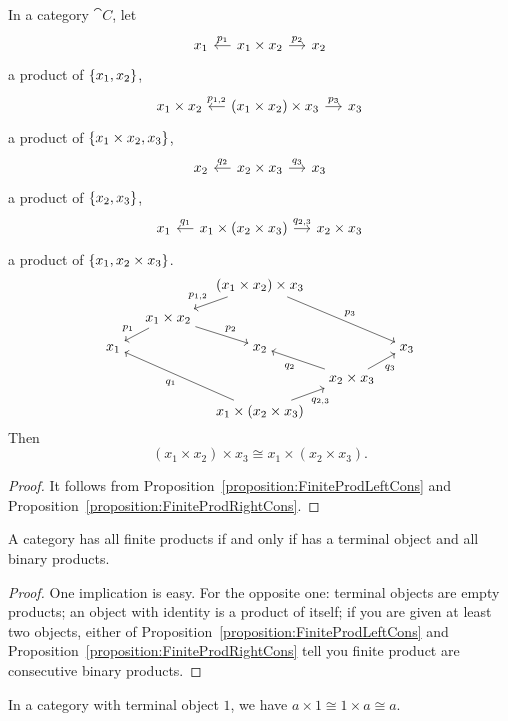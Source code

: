 \begin{corollary}\label{corollary:ProdAssoc}
In a category \(\cat C\), let
\[\begin{tikzcd}[sep=small]
x_1 & x_1 \times x_2 \ar["{p_1}", l, swap] \ar["{p_2}", r] & x_2
\end{tikzcd}\]
a product of \(\left\{x_1, x_2\right\}\),
\[\begin{tikzcd}[sep=small]
x_1 \times x_2 & (x_1 \times x_2) \times x_3 \ar["{p_{1,2}}", l, swap] \ar["{p_3}", r] & x_3
\end{tikzcd}\]
a product of \(\left\{x_1 \times x_2, x_3\right\}\),
\[\begin{tikzcd}[sep=small]
x_2 & x_2 \times x_3 \ar["{q_2}", l, swap] \ar["{q_3}", r] & x_3
\end{tikzcd}\]
a product of \(\left\{x_2, x_3\right\}\),
\[\begin{tikzcd}[sep=small]
x_1 & x_1 \times (x_2 \times x_3) \ar["{q_1}", l, swap] \ar["{q_{2,3}}", r] & x_2 \times x_3
\end{tikzcd}\]
a product of \(\left\{x_1, x_2 \times x_3\right\}\).
\[\begin{tikzcd}[sep=small,cramped]
& & (x_1 \times x_2) \times x_3 \ar["{p_{1,2}}", dl, swap] \ar["{p_3}", ddrr] \\
& x_1 \times x_2 \ar["{p_1}", dl, swap] \ar["{p_2}", dr] \\
x_1 & & x_2 & & x_3 \\
& & & x_2 \times x_3 \ar["{q_2}", ul] \ar["{q_3}", ur, swap] \\
& & x_1 \times (x_2 \times x_3) \ar["{q_1}", uull] \ar["{q_{2, 3}}", ur, swap]
\end{tikzcd}\]
Then
\[(x_1 \times x_2) \times x_3 \cong x_1 \times (x_2 \times x_3) .\]
\end{corollary}

\begin{proof}
It follows from Proposition~\ref{proposition:FiniteProdLeftCons} and Proposition~\ref{proposition:FiniteProdRightCons}.
\end{proof}

\begin{corollary}\label{corollary:FiniteProductsIffTerminalAndBinaryProducts}
A category has all finite products if and only if has a terminal object and all binary products.
\end{corollary}

\begin{proof}
One implication is easy. For the opposite one: terminal objects are empty products; an object with identity is a product of itself; if you are given at least two objects, either of Proposition~\ref{proposition:FiniteProdLeftCons} and Proposition~\ref{proposition:FiniteProdRightCons} tell you finite product are consecutive binary products.
\end{proof}

\begin{exercise}
In a category with terminal object \(1\), we have \(a \times 1 \cong 1 \times a \cong a\).
\end{exercise}

